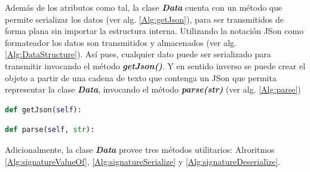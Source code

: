         Además de los atributos como tal, la clase \textbf{\textit{Data}} cuenta con un método que permite serializar los datos (ver alg. \ref{Alg:getJson}), para ser transmitidos de forma plana sin importar la estructura interna. Utilizando la notación JSon como formateador los datos son transmitidos y almacenados (ver alg. \ref{Alg:DataStructure}). Así pues, cualquier dato puede ser serializado para transmitir invocando el método \textbf{\textit{getJson()}}. Y en sentido inverso se puede crear el objeto a partir de una cadena de texto que contenga un JSon que permita representar la clase \textbf{\textit{Data}}, invocando el método \textbf{\textit{parse(str)}} (ver alg. \ref{Alg:parse})
        
        \begin{lstlisting}[language=Python, caption={Firma del método ``\textit{getJson}'' de la clase Data.}, label=Alg:getJson, numbers=none]
def getJson(self):
            \end{lstlisting}
            
        \begin{lstlisting}[language=Python, caption={Firma del método ``\textit{parse}'' de la clase Data.}, label=Alg:parse, numbers=none]
def parse(self, str):
            \end{lstlisting}
        
        
        
    Adicionalmente, la clase \textbf{\textit{Data}} provee tres métodos utilitarios: Alroritmos \ref{Alg:signatureValueOf}, \ref{Alg:signatureSerialize} y \ref{Alg:signatureDeserialize}.
    
